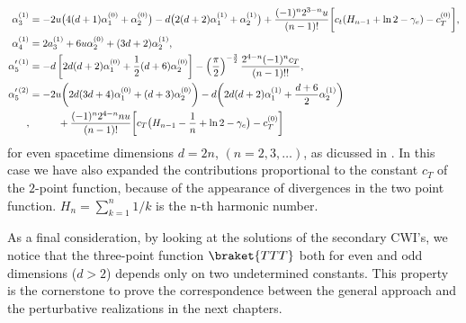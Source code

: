 \documentclass[a4paper,11pt,openright,twoside]{book}
\let\a=\alpha   \let\b=\beta   \let\g=\gamma   \let\d=\delta
\numberwithin{equation}{section}
\begin{document}
{{{\begin{align}
	\a_3^{(1)}&=-2u\big(4(d+1)\a_1^{(0)}+\a_2^{(0)}\big)-d\big(2(d+2)\a_1^{(1)}+\a_2^{(1)}\big)+\frac{(-1)^{n}2^{3-n}u}{(n-1)!}\bigg[c_t(H_{n-1}+\ln 2-\g_e)-c_T^{(0)}\bigg],\\
	\a_4^{(1)}&=2a_3^{(1)}+6u\a_2^{(0)}+(3d+2)\a_2^{(1)},\\
	\a_5^{\prime\,(1)}&=-d\left[2d(d+2)\a_1^{(0)}+\frac{1}{2}(d+6)\a_2^{(0)}\right]-\left(\frac{\pi}{2}\right)^{-\frac{3}{2}}\frac{2^{4-n}(-1)^{n}c_T}{(n-1)!!},\\
	\a_5^{\prime\,(2)}&=-2u\bigg(2d(3d+4)\a_1^{(0)}+(d+3)\a_2^{(0)}\bigg)-d\bigg(2d(d+2)\a_1^{(1)}+\frac{d+6}{2}\a_2^{(1)}\bigg)\notag\\,
	&\hspace{1cm}+\frac{(-1)^n2^{4-n}nu}{(n-1)!}\bigg[c_T\big(H_{n-1}-\frac{1}{n}+\ln 2-\g_e\big)-c_T^{(0)}
	\bigg]
\end{align}
for even spacetime dimensions $d=2n$, $(n=2,3,\dots)$, as dicussed in \cite{Bzowski:2017poo}. In this case we have also expanded the contributions proportional to the constant $c_T$ of the $2$-point function, because of the appearance of divergences in the two point function. $H_n=\sum_{k=1}^n1 /k$ is the n-th harmonic number.

As a final consideration, by looking at the solutions of the secondary CWI's, we notice that the three-point function $\braket{TTT}$  both for even and odd dimensions ($d>2$) depends only on two undetermined constants. This property is the 
cornerstone to prove the correspondence between the general approach and the perturbative realizations in the next chapters.
}

}}
\end{document}
